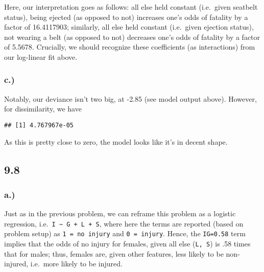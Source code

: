\documentclass[
]{article}
\newenvironment{Shaded}{\begin{snugshade}}{\end{snugshade}}
\newcommand{\AttributeTok}[1]{\textcolor[rgb]{0.77,0.63,0.00}{#1}}
\newcommand{\DecValTok}[1]{\textcolor[rgb]{0.00,0.00,0.81}{#1}}
\newcommand{\FloatTok}[1]{\textcolor[rgb]{0.00,0.00,0.81}{#1}}
\newcommand{\FunctionTok}[1]{\textcolor[rgb]{0.00,0.00,0.00}{#1}}
\newcommand{\NormalTok}[1]{#1}
\newcommand{\SpecialCharTok}[1]{\textcolor[rgb]{0.00,0.00,0.00}{#1}}
\newcommand{\StringTok}[1]{\textcolor[rgb]{0.31,0.60,0.02}{#1}}
\begin{document}
Here, our interpretation goes as follows: all else held constant
(i.e.~given seatbelt status), being ejected (as opposed to not)
increases one's odds of fatality by a factor of 16.4117903; similarly,
all else held constant (i.e.~given ejection status), not wearing a belt
(as opposed to not) decreases one's odds of fatality by a factor of
5.5678. Crucially, we should recognize these coefficients (as
interactions) from our log-linear fit above.

\hypertarget{c.-2}{%
\subsubsection{c.)}\label{c.-2}}

Notably, our deviance isn't two big, at -2.85 (see model output above).
However, for dissimilarity, we have

\begin{Shaded}
\end{Shaded}

\begin{verbatim}
## [1] 4.767967e-05
\end{verbatim}

As this is pretty close to zero, the model looks like it's in decent
shape.

\hypertarget{section-5}{%
\subsection{9.8}\label{section-5}}

\hypertarget{a.-3}{%
\subsubsection{a.)}\label{a.-3}}

Just as in the previous problem, we can reframe this problem as a
logistic regression, i.e.~\texttt{I\ \textasciitilde{}\ G\ +\ L\ +\ S},
where here the terms are reported (based on problem setup) as
\texttt{1\ =\ no\ injury} and \texttt{0\ =\ injury}. Hence, the
\texttt{IG=0.58} term implies that the odds of no injury for females,
given all else (\texttt{L,\ S}) is .58 times that for males; thus,
females are, given other features, less likely to be non-injured,
i.e.~more likely to be injured.
\end{document}
